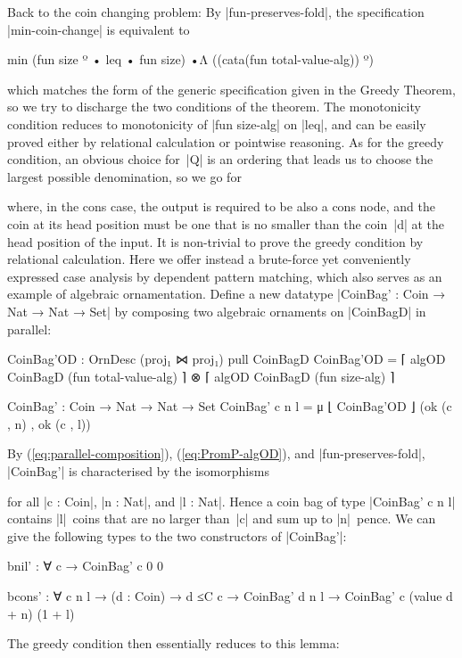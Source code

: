 Back to the coin changing problem:
By |fun-preserves-fold|, the specification |min-coin-change| is equivalent to
\begin{code}
min (fun size º • leq • fun size) •Λ ((cata(fun total-value-alg)) º)
\end{code}
which matches the form of the generic specification given in the Greedy Theorem, so we try to discharge the two conditions of the theorem.
The monotonicity condition reduces to monotonicity of |fun size-alg| on |leq|, and can be easily proved either by relational calculation or pointwise reasoning.
As for the greedy condition, an obvious choice for~|Q| is an ordering that leads us to choose the largest possible denomination, so we go for
where, in the cons case, the output is required to be also a cons node, and the coin at its head position must be one that is no smaller than the coin~|d| at the head position of the input.
It is non-trivial to prove the greedy condition by relational calculation.
Here we offer instead a brute-force yet conveniently expressed case analysis by dependent pattern matching, which also serves as an example of algebraic ornamentation.
Define a new datatype |CoinBag' : Coin → Nat → Nat → Set| by composing two algebraic ornaments on |CoinBagD| in parallel:
\begin{code}
CoinBag'OD : OrnDesc (proj₁ ⋈ proj₁) pull CoinBagD
CoinBag'OD =  ⌈ algOD CoinBagD (fun total-value-alg) ⌉ ⊗
              ⌈ algOD CoinBagD (fun size-alg) ⌉

CoinBag' : Coin → Nat → Nat → Set
CoinBag' c n l = μ ⌊ CoinBag'OD ⌋ (ok (c , n) , ok (c , l))
\end{code}
By (\ref{eq:parallel-composition}), (\ref{eq:PromP-algOD}), and |fun-preserves-fold|, |CoinBag'| is characterised by the isomorphisms
for all |c : Coin|, |n : Nat|, and |l : Nat|.
Hence a coin bag of type |CoinBag' c n l| contains |l|~coins that are no larger than~|c| and sum up to |n|~pence.
We can give the following types to the two constructors of |CoinBag'|:
\begin{code}bnil'   :  ∀ {c} → CoinBag' c 0 0

bcons'  :  ∀ {c n l} → (d : Coin) → d ≤C c →
           CoinBag' d n l → CoinBag' c (value d + n) (1 + l)
\end{code}The greedy condition then essentially reduces to this lemma:
